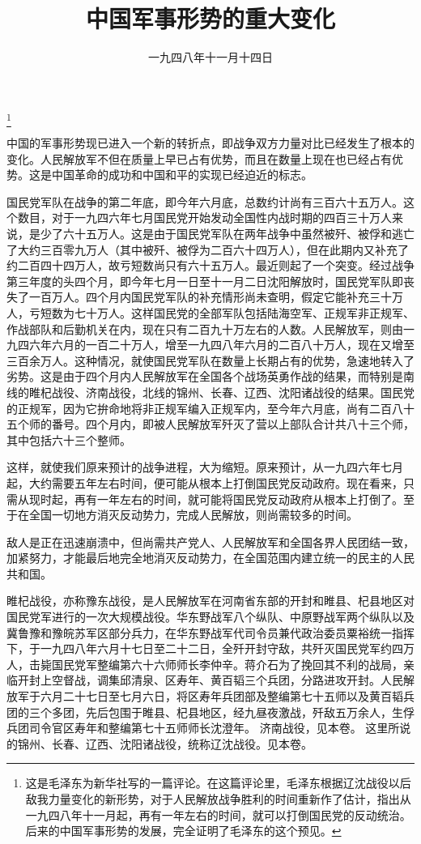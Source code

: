 
\title{中国军事形势的重大变化}
\date{一九四八年十一月十四日}
\thanks{这是毛泽东为新华社写的一篇评论。在这篇评论里，毛泽东根据辽沈战役以后敌我力量变化的新形势，对于人民解放战争胜利的时间重新作了估计，指出从一九四八年十一月起，再有一年左右的时间，就可以打倒国民党的反动统治。后来的中国军事形势的发展，完全证明了毛泽东的这个预见。}
\maketitle


中国的军事形势现已进入一个新的转折点，即战争双方力量对比已经发生了根本的变化。人民解放军不但在质量上早已占有优势，而且在数量上现在也已经占有优势。这是中国革命的成功和中国和平的实现已经迫近的标志。

国民党军队在战争的第二年底，即今年六月底，总数约计尚有三百六十五万人。这个数目，对于一九四六年七月国民党开始发动全国性内战时期的四百三十万人来说，是少了六十五万人。这是由于国民党军队在两年战争中虽然被歼、被俘和逃亡了大约三百零九万人（其中被歼、被俘为二百六十四万人），但在此期内又补充了约二百四十四万人，故亏短数尚只有六十五万人。最近则起了一个突变。经过战争第三年度的头四个月，即今年七月一日至十一月二日沈阳解放时，国民党军队即丧失了一百万人。四个月内国民党军队的补充情形尚未查明，假定它能补充三十万人，亏短数为七十万人。这样国民党的全部军队包括陆海空军、正规军非正规军、作战部队和后勤机关在内，现在只有二百九十万左右的人数。人民解放军，则由一九四六年六月的一百二十万人，增至一九四八年六月的二百八十万人，现在又增至三百余万人。这种情况，就使国民党军队在数量上长期占有的优势，急速地转入了劣势。这是由于四个月内人民解放军在全国各个战场英勇作战的结果，而特别是南线的睢杞战役、济南战役，北线的锦州、长春、辽西、沈阳诸战役的结果。国民党的正规军，因为它拚命地将非正规军编入正规军内，至今年六月底，尚有二百八十五个师的番号。四个月内，即被人民解放军歼灭了营以上部队合计共八十三个师，其中包括六十三个整师。

这样，就使我们原来预计的战争进程，大为缩短。原来预计，从一九四六年七月起，大约需要五年左右时间，便可能从根本上打倒国民党反动政府。现在看来，只需从现时起，再有一年左右的时间，就可能将国民党反动政府从根本上打倒了。至于在全国一切地方消灭反动势力，完成人民解放，则尚需较多的时间。

敌人是正在迅速崩溃中，但尚需共产党人、人民解放军和全国各界人民团结一致，加紧努力，才能最后地完全地消灭反动势力，在全国范围内建立统一的民主的人民共和国。


\begin{maonote}
睢杞战役，亦称豫东战役，是人民解放军在河南省东部的开封和睢县、杞县地区对国民党军进行的一次大规模战役。华东野战军八个纵队、中原野战军两个纵队以及冀鲁豫和豫皖苏军区部分兵力，在华东野战军代司令员兼代政治委员粟裕统一指挥下，于一九四八年六月十七日至二十二日，全歼开封守敌，共歼灭国民党军约四万人，击毙国民党军整编第六十六师师长李仲辛。蒋介石为了挽回其不利的战局，亲临开封上空督战，调集邱清泉、区寿年、黄百韬三个兵团，分路进攻开封。人民解放军于六月二十七日至七月六日，将区寿年兵团部及整编第七十五师以及黄百韬兵团的三个多团，先后包围于睢县、杞县地区，经九昼夜激战，歼敌五万余人，生俘兵团司令官区寿年和整编第七十五师师长沈澄年。
济南战役，见本卷。
这里所说的锦州、长春、辽西、沈阳诸战役，统称辽沈战役。见本卷。
\end{maonote}
